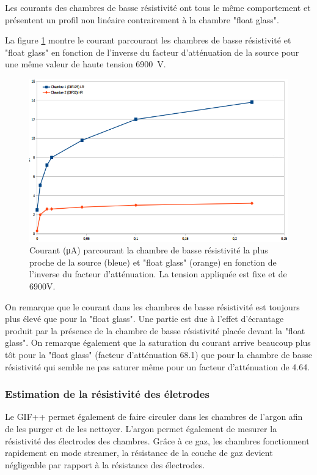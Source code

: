 Les courants des chambres de basse résistivité ont tous le même comportement et présentent un profil non linéaire contrairement à la chambre "float glass".

La figure \ref{currentsamHV} montre le courant parcourant les chambres de basse résistivité et "float glass" en fonction de l'inverse du facteur d'atténuation de la source pour une même valeur de haute tension \SI{6900}{\volt}.

\begin{figure}[ht!]
	\centering
	\includegraphics[width=.75\linewidth]{GLA/current_same_HV.png}
	\caption{Courant (\si{\micro\ampere}) parcourant la chambre de basse résistivité la plus proche de la source (bleue) et "float glass" (orange) en fonction de l'inverse du facteur d'atténuation. La tension appliquée est fixe et de 6900V.}
	\label{currentsamHV}
\end{figure}

On remarque que le courant dans les chambres de basse résistivité est toujours plus élevé que pour la "float glass". Une partie est due à l'effet d'écrantage produit par la présence de la chambre de basse résistivité placée devant la "float glass". On remarque également que la saturation du courant arrive beaucoup plus tôt pour la "float glass" (facteur d'atténuation 68.1) que pour la chambre de basse résistivité qui semble ne pas saturer même pour un facteur d'atténuation de \num{4.64}.

\subsubsection{Estimation de la résistivité des életrodes}

Le GIF++ permet également de faire circuler dans les chambres de l'argon afin de les purger et de les nettoyer. L'argon permet également de mesurer la résistivité des électrodes des chambres. Grâce à ce gaz, les chambres fonctionnent rapidement en mode streamer, la résistance de la couche de gaz devient négligeable  par rapport à la résistance des électrodes. 

